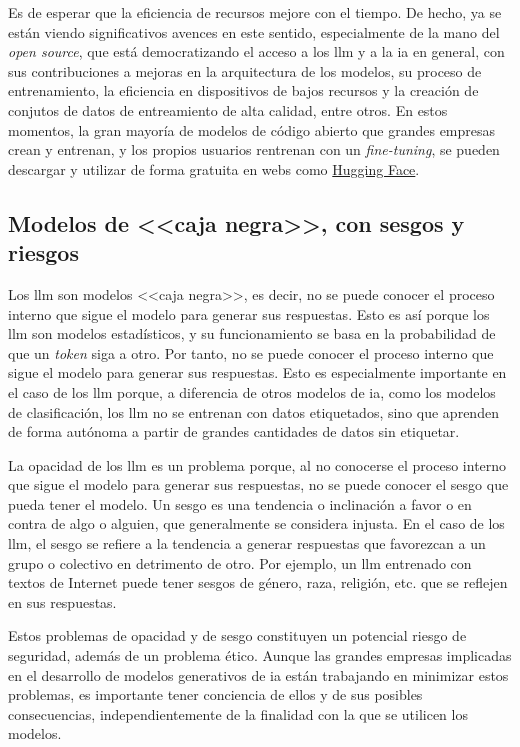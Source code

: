 Es de esperar que la eficiencia de recursos mejore con el tiempo. De hecho, ya se están viendo significativos avences en este sentido, especialmente de la mano del \textit{open source}, que está democratizando el acceso a los \gls{llm} y a la \gls{ia} en general, con sus contribuciones a mejoras en la arquitectura de los modelos, su proceso de entrenamiento, la eficiencia en dispositivos de bajos recursos y la creación de conjutos de datos de entreamiento de alta calidad, entre otros. En estos momentos, la gran mayoría de modelos de código abierto que grandes empresas crean y entrenan, y los propios usuarios rentrenan con un \textit{fine-tuning}, se pueden descargar y utilizar de forma gratuita en webs como \href{https://huggingface.co/}{Hugging Face}.


\subsection{Modelos de <<caja negra>>, con sesgos y riesgos}

Los \gls{llm} son modelos <<caja negra>>, es decir, no se puede conocer el proceso interno que sigue el modelo para generar sus respuestas. Esto es así porque los \gls{llm} son modelos estadísticos, y su funcionamiento se basa en la probabilidad de que un \textit{token} siga a otro. Por tanto, no se puede conocer el proceso interno que sigue el modelo para generar sus respuestas. Esto es especialmente importante en el caso de los \gls{llm} porque, a diferencia de otros modelos de \gls{ia}, como los modelos de clasificación, los \gls{llm} no se entrenan con datos etiquetados, sino que aprenden de forma autónoma a partir de grandes cantidades de datos sin etiquetar.

La opacidad de los \gls{llm} es un problema porque, al no conocerse el proceso interno que sigue el modelo para generar sus respuestas, no se puede conocer el sesgo que pueda tener el modelo. Un sesgo es una tendencia o inclinación a favor o en contra de algo o alguien, que generalmente se considera injusta. En el caso de los \gls{llm}, el sesgo se refiere a la tendencia a generar respuestas que favorezcan a un grupo o colectivo en detrimento de otro. Por ejemplo, un \gls{llm} entrenado con textos de Internet puede tener sesgos de género, raza, religión, etc. que se reflejen en sus respuestas.

Estos problemas de opacidad y de sesgo constituyen un potencial riesgo de seguridad, además de un problema ético. Aunque las grandes empresas implicadas en el desarrollo de modelos generativos de \gls{ia} están trabajando en minimizar estos problemas, es importante tener conciencia de ellos y de sus posibles consecuencias, independientemente de la finalidad con la que se utilicen los modelos.